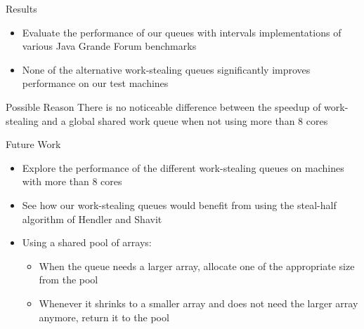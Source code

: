 \begin{frame}{Results}
  \begin{itemize}
  \item Evaluate the performance of our queues with intervals
    implementations of various Java Grande Forum benchmarks
  \item None of the alternative work-stealing queues significantly
    improves performance on our test machines
  \end{itemize}


  \begin{block}{Possible Reason}
    There is no noticeable difference between the speedup of
    work-stealing and a global shared work queue when not using more
    than 8 cores
  \end{block}
\end{frame}


\begin{frame}{Future Work}
  \begin{itemize}
  \item Explore the performance of the different work-stealing queues
    on machines with more than 8 cores
  \item See how our work-stealing queues would benefit from using the
    steal-half algorithm of Hendler and Shavit
  \item Using a shared pool of arrays:
    \begin{itemize}
    \item When the queue needs a larger array, allocate one of the
      appropriate size from the pool
    \item Whenever it shrinks to a smaller array and does not need the
      larger array anymore, return it to the pool
    \end{itemize}
  \end{itemize}
\end{frame}

